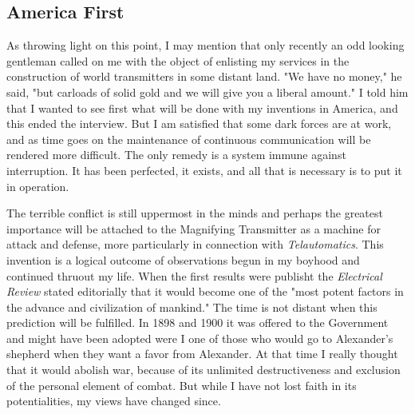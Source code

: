 \documentclass[a4paper,12pt,english,twoside,openright]{memoir}
\begin{document}
\subsection{America First}
As throwing light on this point, I may mention that only recently an odd looking gentleman called 
on me with the object of enlisting my services in the construction of world transmitters in some 
distant land.  "We have no money," he said, "but carloads of solid gold and we will give you a 
liberal amount." I told him that I wanted to see first what will be done with my inventions in 
America, and this ended the interview.  But I am satisfied that some dark forces are at work, and 
as time goes on the maintenance of continuous communication will be rendered more difficult.  
The only remedy is a system immune against interruption.  It has been perfected, it exists, and all 
that is necessary is to put it in operation.  

The terrible conflict is still uppermost in the minds and perhaps the greatest importance will be 
attached to the Magnifying Transmitter as a machine for attack and defense, more particularly in 
connection with \emph{Telautomatics}.  This invention is a logical outcome of observations begun in my 
boyhood and continued thruout my life.  When the first results were publisht the \emph{Electrical Review} 
stated editorially that it would become one of the "most potent factors in the advance and 
civilization of mankind." The time is not distant when this prediction will be fulfilled.  In 1898 and 
1900 it was offered to the Government and might have been adopted were I one of those who 
would go to Alexander's shepherd when they want a favor from Alexander.  At that time I really 
thought that it would abolish war, because of its unlimited destructiveness and exclusion of the 
personal element of combat.  But while I have not lost faith in its potentialities, my views have 
changed since.  
\end{document}
